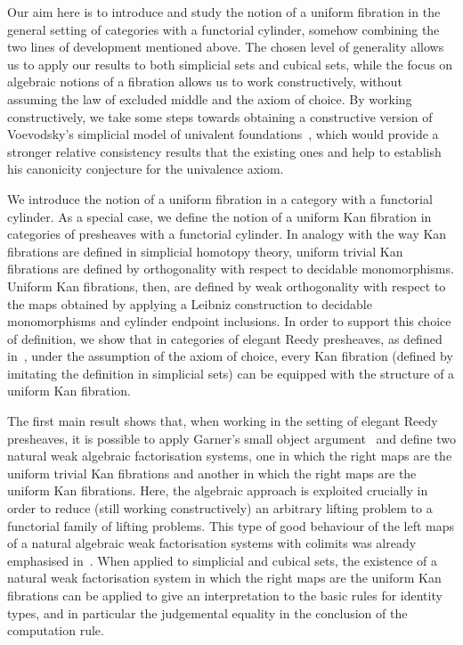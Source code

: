 \documentclass[reqno,10pt,a4paper,oneside,draft]{amsart}
\begin{document}
Our aim here is to introduce and study the notion of a uniform fibration in the general setting of categories with a functorial cylinder, somehow combining the two lines of development mentioned above.
The chosen level of generality allows us to apply our results to both simplicial sets and cubical sets, while the focus on algebraic notions of a fibration allows us to work constructively, \ie without assuming the law of excluded middle and the axiom of choice.
By working constructively, we take some steps towards obtaining a constructive version of Voevodsky's simplicial model of univalent foundations~\cite{voevodsky-simplicial-model}, which would provide a stronger relative consistency results that the existing ones and help to establish his canonicity conjecture for the univalence axiom.

We introduce the notion of a uniform fibration in a category with a functorial cylinder.
As a special case, we define the notion of a uniform Kan fibration in categories of presheaves with a functorial cylinder.
In analogy with the way Kan fibrations are defined in simplicial homotopy theory, uniform trivial Kan fibrations are defined by orthogonality with respect to decidable monomorphisms.
Uniform Kan fibrations, then, are defined by weak orthogonality with respect to the maps obtained by applying a Leibniz construction to decidable monomorphisms and cylinder endpoint inclusions.
In order to support this choice of definition, we show that in categories of elegant Reedy presheaves, as defined in~\cite{bergner-rezk-elegant}, under the assumption of the axiom of choice, every Kan fibration (defined by imitating the definition in simplicial sets) can be equipped with the structure of a uniform Kan fibration.


The first main result shows that, when working in the setting of elegant Reedy presheaves, it is possible to apply Garner's small object argument~\cite{garner:small-object-argument} and define two natural weak algebraic factorisation systems, one in which the right maps are the uniform trivial Kan fibrations and another in which the right maps are the uniform Kan fibrations.
Here, the algebraic approach is exploited crucially in order to reduce (still working constructively) an arbitrary lifting problem to a functorial family of lifting problems.
This type of good behaviour of the left maps of a natural algebraic weak factorisation systems with colimits was already emphasised in~\cite{riehl-cat-homotopy}.
When applied to simplicial and cubical sets, the existence of a natural weak factorisation system in which the right maps are the uniform Kan fibrations can be applied to give an interpretation to the basic rules for identity types, and in particular the judgemental equality in the conclusion of the computation rule.
\end{document}
